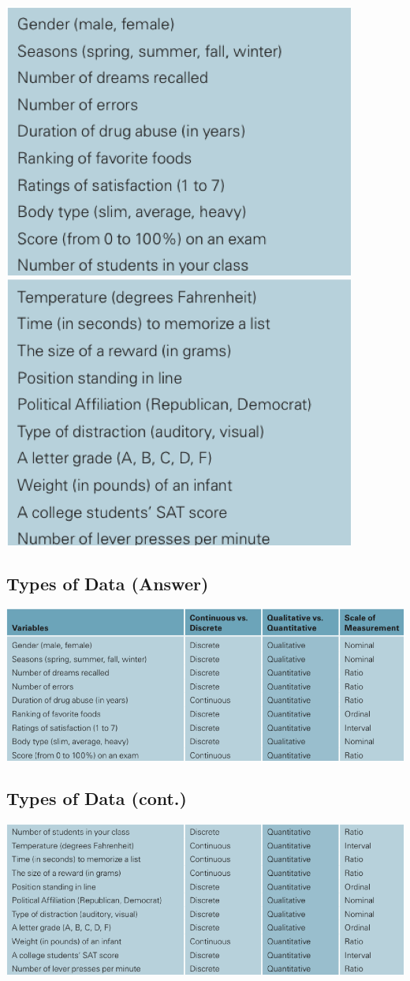 \documentclass[]{article}
\begin{document}
\includegraphics[width=0.4\linewidth]{figure/variables1}
\includegraphics[width=0.4\linewidth]{figure/variables2}

\hypertarget{types-of-data-answer}{%
\subsection{Types of Data (Answer)}\label{types-of-data-answer}}

\includegraphics[width=0.9\linewidth,height=0.9\textheight]{figure/TOD1}

\hypertarget{types-of-data-cont.}{%
\subsection{Types of Data (cont.)}\label{types-of-data-cont.}}

\includegraphics[width=0.9\linewidth,height=0.9\textheight]{figure/TOD2}
\end{document}
